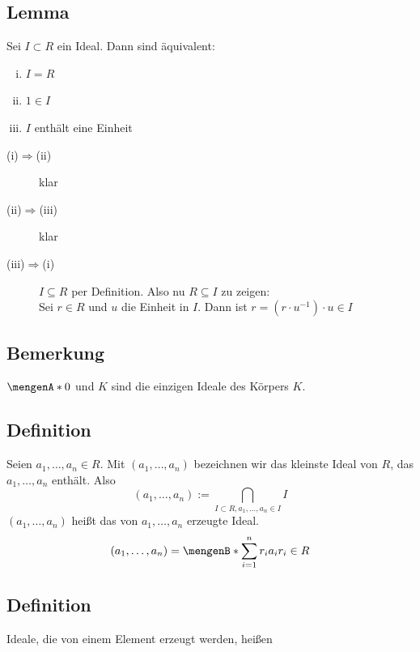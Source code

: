 \subsection[Lemma über Ideale und Einheiten]{Lemma} %
\label{sub:94}
Sei $I \subset R$ ein Ideal. Dann sind äquivalent:
\begin{enumerate}[(i)]
	\item $I = R$
	\item $1 \in I$
	\item $I$ enthält eine Einheit
\end{enumerate}
\begin{description}
	\item[(i)$\Rightarrow$(ii)] klar
	\item[(ii)$\Rightarrow $(iii)] klar
	\item[(iii)$\Rightarrow $(i)] $I \subseteq R$ per Definition. Also nu $R \subseteq I$ zu zeigen: \\
	Sei $r \in R$ und $u$ die Einheit in $I$. Dann ist $r= (r \cdot u ^{-1}) \cdot u \in I$ \bewende
\end{description}

\subsection[Bemerkung über die Ideale eines Körpers]{Bemerkung} %
\label{sub:95}
$\set{0} $ und $K$ sind die einzigen Ideale des Körpers $K$.

\subsection[Definition: kleinstes und erzeugtes Ideal]{Definition} %
\label{sub:96}
Seien $a_1, \ldots , a_n \in R$. Mit $(a_1, \ldots , a_n)$ bezeichnen wir das kleinste Ideal  von $R$, das $a_1, \ldots , a_n$ enthält. Also 
\[
	(a_1, \ldots , a_n) := \bigcap_{I \subset R, a_1, \ldots , a_n \in I} I
\]
$(a_1, \ldots , a_n)$ heißt das von $a_1, \ldots , a_n$ erzeugte Ideal. 
\[
	(a_1, \ldots , a_n) = \set[\sum_{i=1}^{n} r_i a_i]{r_i \in R} 
\]

\subsection[Definition: Hauptideal]{Definition} %
\label{sub:97}
Ideale, die von einem Element erzeugt werden, heißen  

